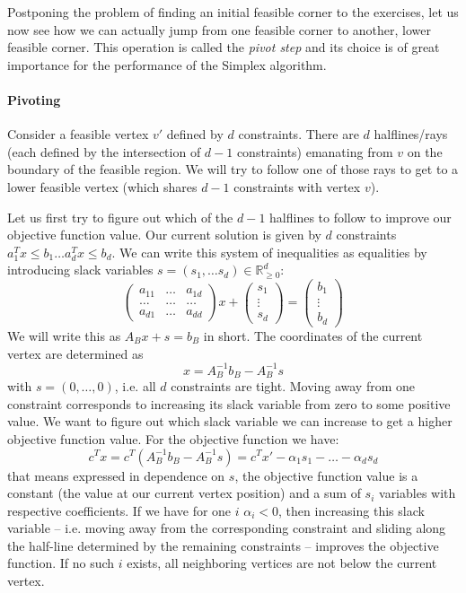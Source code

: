 \documentclass{article}
\newcommand{\setR}{\mathbb{R}}
\newcommand{\mat}[1]{ \begin{pmatrix} #1 \end{pmatrix}}
\begin{document}
Postponing the problem of finding an initial feasible corner to the exercises, let us now see how we can actually jump from one feasible corner to another, lower feasible corner. This operation is called the \emph{pivot step} and its choice is of great importance for the performance of the Simplex algorithm.

\paragraph*{Pivoting}
Consider a feasible vertex $v'$ defined by $d$ constraints. There are $d$ halflines/rays (each defined by the intersection of $d-1$ constraints) emanating from $v$ on the boundary of the feasible region. We will try to follow one of those rays to get to a lower feasible vertex (which shares $d-1$ constraints with vertex $v$).

Let us first try to figure out which of the $d-1$ halflines to follow to improve our objective function value.
Our current solution is given by $d$ constraints $a_1^Tx\leq b_1 \dots a_d^Tx \leq b_d$. We can write
this system of inequalities as equalities by introducing slack variables $s=(s_1,\dots s_d)\in \setR^d_{\geq0}$:
\[
	\mat{a_{11} & \dots & a_{1d} \\ \dots & \dots & \dots \\ a_{d1} & \dots & a_{dd}} x 
		+ \mat{s_1\\ \vdots \\ s_d} = \mat{b_1\\ \vdots \\ b_d}
\]
We will write this as $A_B x + s = b_B$ in short. The coordinates of the current vertex are determined as 
\[
	x=A_B^{-1}b_B - A_B^{-1}s	
\]
with $s=(0,\dots,0)$, i.e. all $d$ constraints are tight. Moving away from one constraint corresponds to 
increasing its slack variable from zero to some positive value. We want to figure out which slack variable
we can increase to get a higher objective function value. For the objective function we have:
\[
	c^Tx= c^T(A_B^{-1}b_B - A_B^{-1}s)= c^T x' - \alpha_1 s_1 - \dots - \alpha_d s_d
\]
that means expressed in dependence on $s$, the objective function value is a constant (the value at our current
vertex position) and a sum of $s_i$ variables with respective coefficients. If we have for one $i$ 
$\alpha_i<0$, then increasing this slack variable -- i.e. moving away from the corresponding constraint and
sliding along the half-line determined by the remaining constraints -- improves the objective function.
If no such $i$ exists, all neighboring vertices are not below the current vertex.
\end{document}
